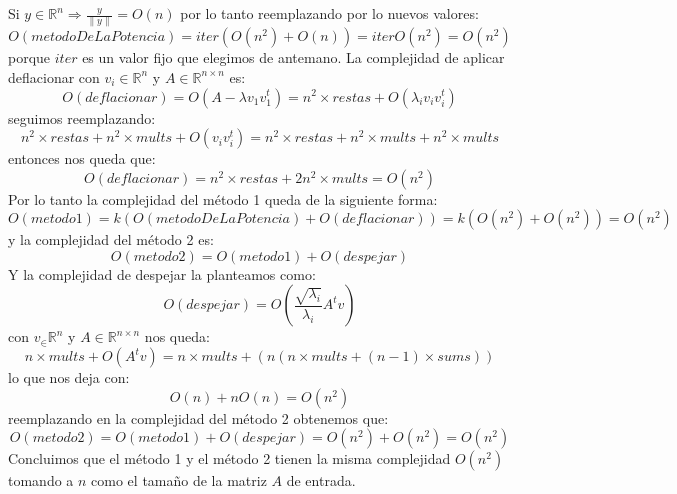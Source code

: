 Si $y\in\mathbb{R}^n \Rightarrow \frac{y}{\parallel y \parallel} = O(n)$ por lo tanto reemplazando por lo nuevos valores: 
\begin{displaymath}
  O(metodoDeLaPotencia) = iter(O(n^2) + O(n)) = iterO(n^2) = O(n^2)
\end{displaymath}
porque $iter$ es un valor fijo que elegimos de antemano. La complejidad de aplicar deflacionar con
$v_i\in\mathbb{R}^n$ y $A\in\mathbb{R}^{n \times n}$ es:
\begin{displaymath}
  O(deflacionar) = O(A-\lambda{v_1}v_1^t) = n^2 \times restas + O(\lambda_i{v_i}v_i^t) 
\end{displaymath}
seguimos reemplazando:
\begin{displaymath}
n^2 \times restas + n^2 \times mults + O(v_i{v_i^t}) = n^2 \times restas + n^2 \times mults + n^2 \times mults
\end{displaymath}
entonces nos queda que:
\begin{displaymath}
 O(deflacionar) = n^2 \times restas + 2n^2 \times mults = O(n^2) 
\end{displaymath}
Por lo tanto la complejidad del método 1 queda de la siguiente forma:
\begin{displaymath}
O(metodo1) = k (O(metodoDeLaPotencia) + O(deflacionar)) = k(O(n^2) + O(n^2)) = O(n^2) 
\end{displaymath}
y la complejidad del método 2 es:
\begin{displaymath}
O(metodo2) = O(metodo1) + O(despejar)
\end{displaymath}
Y la complejidad de despejar la planteamos como:
\begin{displaymath}
O(despejar) = O(\frac{ \sqrt{\lambda_{i} } }{ \lambda_{i} }  A^{t}v)
\end{displaymath}
con $v_\in\mathbb{R}^n$ y $A\in\mathbb{R}^{n \times n}$ nos queda:
\begin{displaymath}
 n \times mults + O(A^{t}v) = n \times mults + (n(n \times mults + (n-1) \times sums))  
\end{displaymath}
lo que nos deja con:
\begin{displaymath}
 O(n) + nO(n) = O(n^2)
\end{displaymath}
reemplazando en la complejidad del método 2 obtenemos que:
\begin{displaymath}
 O(metodo2) = O(metodo1) + O(despejar) = O(n^2) + O(n^2) = O(n^2)
\end{displaymath}
Concluimos que el método 1 y el método 2 tienen la misma complejidad $O(n^2)$ tomando a $n$ como el tamaño de la matriz $A$ de entrada.
